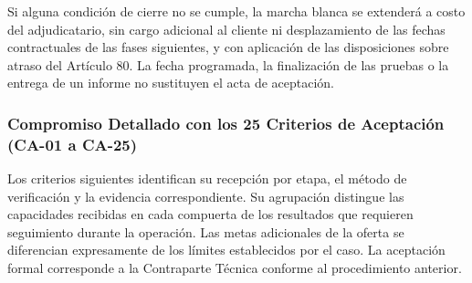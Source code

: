 Si alguna condición de cierre no se cumple, la marcha blanca se extenderá a costo del adjudicatario, sin cargo adicional al cliente ni desplazamiento de las fechas contractuales de las fases siguientes, y con aplicación de las disposiciones sobre atraso del Artículo 80. La fecha programada, la finalización de las pruebas o la entrega de un informe no sustituyen el acta de aceptación.

\subsubsection{Compromiso Detallado con los 25 Criterios de Aceptación (CA-01 a CA-25)}
Los criterios siguientes identifican su recepción por etapa, el método de verificación y la evidencia correspondiente. Su agrupación distingue las capacidades recibidas en cada compuerta de los resultados que requieren seguimiento durante la operación. Las metas adicionales de la oferta se diferencian expresamente de los límites establecidos por el caso. La aceptación formal corresponde a la Contraparte Técnica conforme al procedimiento anterior.

